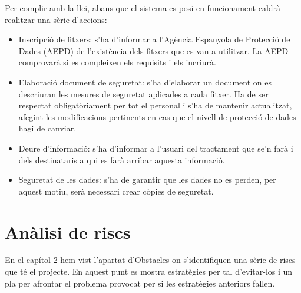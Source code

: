 Per complir amb la llei, abans que el sistema es posi en funcionament caldrà realitzar una sèrie d'accions:
\begin{itemize}
\item{}Inscripció de fitxers: s'ha d'informar a l'Agència Espanyola de Protecció de Dades (AEPD) de l'existència dels fitxers que es van a utilitzar. La AEPD comprovarà si es compleixen els requisits i els incriurà.
\item{}Elaboració document de seguretat: s'ha d'elaborar un document on es
descriuran les mesures de seguretat aplicades a cada fitxer. Ha de ser respectat obligatòriament per tot el personal i s'ha de mantenir actualitzat, afegint les modificacions pertinents en cas que el nivell de protecció de dades hagi de canviar.
\item{}Deure d'informació: s'ha d'informar a l'usuari del tractament que se'n farà i dels destinataris a qui es farà arribar aquesta informació.
\item{}Seguretat de les dades: s'ha de garantir que les dades no es perden, per aquest motiu, serà necessari crear còpies de seguretat.

\end{itemize}

\section{Anàlisi de riscs}

En el capítol 2 hem vist l'apartat d'Obstacles on s'identifiquen una sèrie de
riscs que té el projecte. En aquest punt es mostra estratègies per tal d'evitar-los
i un pla per afrontar el problema provocat per si les estratègies anteriors fallen.

